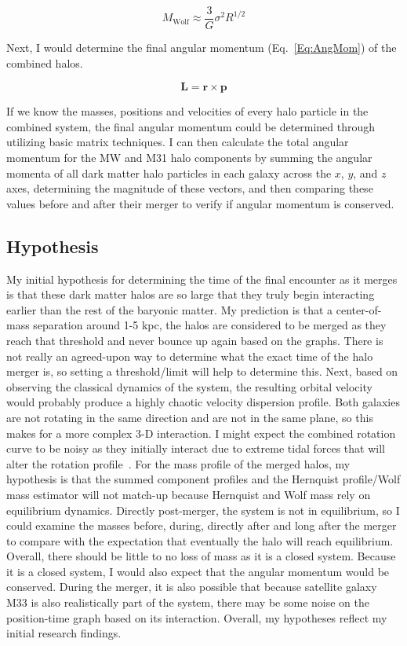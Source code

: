 \documentclass[linenumbers,trackchanges]{aastex7}
\begin{document}
\begin{equation}
    \label{Eq:Wolf}
    M_\mathrm{Wolf}\approx\frac{3}{G}\sigma^2 R^{1/2}
\end{equation}

Next, I would determine the final angular momentum (Eq.~\ref{Eq:AngMom}) of the combined halos. 

\begin{equation}
    \label{Eq:AngMom}
    \mathbf{L} = \mathbf{r}\times\mathbf{p}
\end{equation}

If we know the masses, positions and velocities of every halo particle in the combined system, the final angular momentum could be determined through utilizing basic matrix techniques. I can then calculate the total angular momentum for the MW and M31 halo components by summing the angular momenta of all dark matter halo particles in each galaxy across the $x$, $y$, and $z$ axes, determining the magnitude of these vectors, and then comparing these values before and after their merger to verify if angular momentum is conserved. 

\subsection{Hypothesis}
My initial hypothesis for determining the time of the final encounter as it merges is that these dark matter halos are so large that they truly begin interacting earlier than the rest of the baryonic matter. My prediction is that a center-of-mass separation around 1-5 kpc, the halos are considered to be merged as they reach that threshold and never bounce up again based on the graphs. There is not really an agreed-upon way to determine what the exact time of the halo merger is, so setting a threshold/limit will help to determine this. Next, based on observing the classical dynamics of the system, the resulting orbital velocity would probably produce a highly chaotic velocity dispersion profile. Both galaxies are not rotating in the same direction and are not in the same plane, so this makes for a more complex 3-D interaction. I might expect the combined rotation curve to be noisy as they initially interact due to extreme tidal forces that will alter the rotation profile~\citep{Dubinski1992ApJ401}. For the mass profile of the merged halos, my hypothesis is that the summed component profiles and the Hernquist profile/Wolf mass estimator will not match-up because Hernquist and Wolf mass rely on equilibrium dynamics. Directly post-merger, the system is not in equilibrium, so I could examine the masses before, during, directly after and long after the merger to compare with the expectation that eventually the halo will reach equilibrium. Overall, there should be little to no loss of mass as it is a closed system. Because it is a closed system, I would also expect that the angular momentum would be conserved. During the merger, it is also possible that because satellite galaxy M33 is also realistically part of the system, there may be some noise on the position-time graph based on its interaction. Overall, my hypotheses reflect my initial research findings.




\end{document}
